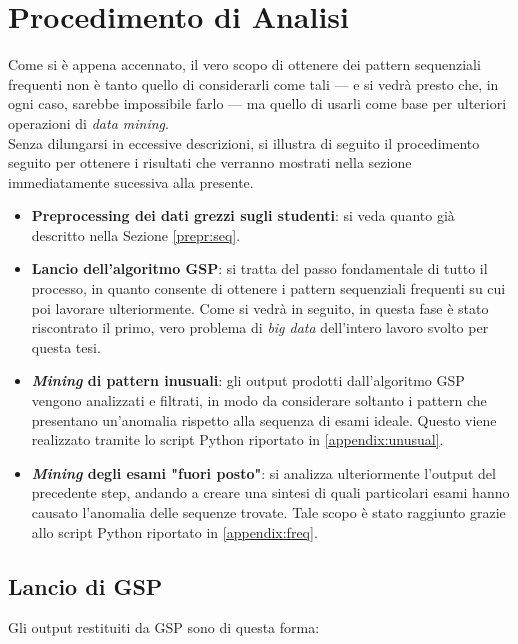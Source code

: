 \section{Procedimento di Analisi}

    Come si è appena accennato, il vero scopo di ottenere dei pattern sequenziali frequenti non è tanto quello di considerarli come tali --- e si vedrà presto che, in ogni caso, sarebbe impossibile farlo --- ma quello di usarli come base per ulteriori operazioni di \textit{data mining}. \\

    Senza dilungarsi in eccessive descrizioni, si illustra di seguito il procedimento seguito per ottenere i risultati che verranno mostrati nella sezione immediatamente sucessiva alla presente.

    \begin{itemize}
        \item \textbf{Preprocessing dei dati grezzi sugli studenti}: si veda quanto già descritto nella Sezione \ref{prepr:seq}.
        \item \textbf{Lancio dell'algoritmo GSP}: si tratta del passo fondamentale di tutto il processo, in quanto consente di ottenere i pattern sequenziali frequenti su cui poi lavorare ulteriormente. Come si vedrà in seguito, in questa fase è stato riscontrato il primo, vero problema di \textit{big data} dell'intero lavoro svolto per questa tesi.
        \item \textbf{\textit{Mining} di pattern inusuali}: gli output prodotti dall'algoritmo GSP vengono analizzati e filtrati, in modo da considerare soltanto i pattern che presentano un'anomalia rispetto alla sequenza di esami ideale. Questo viene realizzato tramite lo script Python riportato in \ref{appendix:unusual}.
        \item \textbf{\textit{Mining} degli esami "fuori posto"}: si analizza ulteriormente l'output del precedente step, andando a creare una sintesi di quali particolari esami hanno causato l'anomalia delle sequenze trovate. Tale scopo è stato raggiunto grazie allo script Python riportato in \ref{appendix:freq}.
    \end{itemize}

    \subsection{Lancio di GSP}

        Gli output restituiti da GSP sono di questa forma: \\


